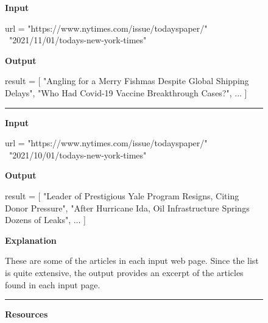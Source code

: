 \begin{figure}
\begin{mdframed}[backgroundcolor=gray!04] 
\begin{scriptsize}



\textbf{Input} 


\begin{python}
url = "https://www.nytimes.com/issue/todayspaper/" \
  "2021/11/01/todays-new-york-times"
\end{python}

\textbf{Output}


\begin{python}
result = [ 
  "Angling for a Merry Fishmas Despite Global Shipping Delays",
  "Who Had Covid-19 Vaccine Breakthrough Cases?", ...
]
\end{python}



\begin{center}
\rule{10cm}{0.4pt}
\end{center}



\textbf{Input}

\begin{python}
url = "https://www.nytimes.com/issue/todayspaper/" \
  "2021/10/01/todays-new-york-times"
\end{python}

\textbf{Output}


\begin{python}
result = [ 
  "Leader of Prestigious Yale Program Resigns, Citing Donor Pressure",
  "After Hurricane Ida, Oil Infrastructure Springs Dozens of Leaks", ... 
]
\end{python}


\textbf{Explanation} \medskip


These are some of the articles in each input web page. Since the list is quite extensive, the output provides an excerpt of the articles found in each input page. 



\begin{center}
\rule{10cm}{0.4pt}
\end{center}
  


\textbf{Resources}


\end{scriptsize}
\end{mdframed}
\end{figure}
